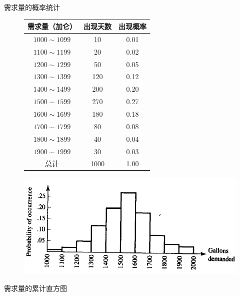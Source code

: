 \documentclass[mathserif, table]{beamer}
\begin{document}
\begin{frame}{需求量的概率统计}
  \begin{figure}
    \begin{tabular}{ccc}
      \hline\hline
      需求量（加仑） & 出现天数 & 出现概率\\
      \hline
      $1000 \sim 1099$ & 10 & 0.01\\
      $1100 \sim 1199$ & 20 & 0.02\\
      $1200 \sim 1299$ & 50 & 0.05\\
      $1300 \sim 1399$ & 120 & 0.12\\
      $1400 \sim 1499$ & 200 & 0.20\\
      $1500 \sim 1599$ & 270 & 0.27\\
      $1600 \sim 1699$ & 180 & 0.18\\
      $1700 \sim 1799$ & 80 & 0.08\\
      $1800 \sim 1899$ & 40 & 0.04\\
      $1900 \sim 1999$ & 30 & 0.03\\
      \hline
      总计 & 1000 & 1.00
    \end{tabular}
    \includegraphics[width=.4\textwidth{}]{gas-freq.png}
  \end{figure}
\end{frame}

\begin{frame}{需求量的累计直方图}
  \begin{figure}
    \setcounter{subfigure}{0}{}
  \end{figure}
\end{frame}
\end{document}
